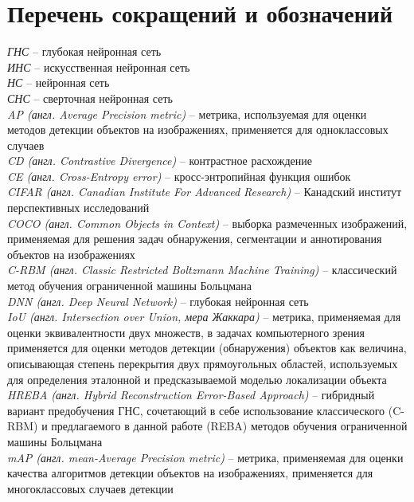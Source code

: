 \chapter*{Перечень сокращений и обозначений}

\noindent\textit{ГНС} -- глубокая нейронная сеть\\
\textit{ИНС} -- искусственная нейронная сеть\\
\textit{НС} -- нейронная сеть\\
\textit{СНС} -- сверточная нейронная сеть\\
\textit{AP (англ. Average Precision metric)} -- метрика, используемая для оценки методов детекции объектов на изображениях, применяется для одноклассовых случаев\\
\textit{CD (англ. Contrastive Divergence)} -- контрастное расхождение\\
\textit{CE (англ. Cross-Entropy error)} -- кросс-энтропийная функция ошибок\\
\textit{CIFAR (англ. Canadian Institute For Advanced Research)} -- Канадский институт перспективных исследований\\
\textit{COCO (англ. Common Objects in Context)} -- выборка размеченных изображений, применяемая для решения задач обнаружения, сегментации и аннотирования объектов на изображениях\\
\textit{C-RBM (англ. Classic Restricted Boltzmann Machine Training)} -- классический метод обучения ограниченной машины Больцмана\\
\textit{DNN (англ. Deep Neural Network)} -- глубокая нейронная сеть\\
\textit{IoU (англ. Intersection over Union, мера Жаккара)} -- метрика, применяемая для оценки эквивалентности двух множеств, в задачах компьютерного зрения применяется для оценки методов детекции (обнаружения) объектов как величина, описывающая степень перекрытия двух прямоугольных областей, используемых для определения эталонной и предсказываемой моделью локализации объекта \\
\textit{HREBA (англ. Hybrid Reconstruction Error-Based Approach)} -- гибридный вариант предобучения ГНС, сочетающий в себе использование классического (C-RBM) и предлагаемого в данной работе (REBA) методов обучения ограниченной машины Больцмана\\
\textit{mAP (англ. mean-Average Precision metric)} -- метрика, применяемая для оценки качества алгоритмов детекции объектов на изображениях, применяется для многоклассовых случаев детекции\\
